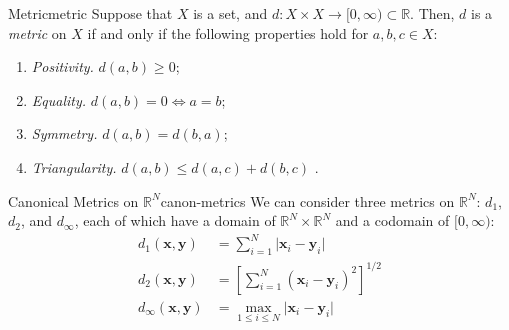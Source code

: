 \documentclass{article}
\renewcommand*\vec{\mathbf}
\numberwithin{equation}{section}
\numberwithin{enumi}{section}
\begin{document}
\begin{definition}{Metric}{metric}
    Suppose that $ X $ is a set, and $ d \colon X \times X \to [0, \infty)
    \subset \mathbb{R} $. Then, $ d $ is a \emph{metric} on $ X $ if and only if
    the following properties hold for $ a, b, c \in X $:
    \begin{enumerate}
        \item \emph{Positivity.} $ d(a, b) \geq 0 $;
        \item \emph{Equality.} $ d(a, b) = 0 \iff a = b $;
        \item \emph{Symmetry.} $ d(a, b) = d(b, a) $;
        \item \emph{Triangularity.} $ d(a, b) \leq d(a, c) + d(b, c) $
            \label{itm:triangle-inequality}.
    \end{enumerate}
\end{definition}
\begin{definition}{Canonical Metrics on \texorpdfstring{$\mathbb{R}^N$}{an
        N-dimensional real vector space}}{canon-metrics}
    We can consider three metrics on $ \mathbb{R}^N $: $ d_1 $, $ d_2 $, and
    $ d_\infty $, each of which have a domain of $ \mathbb{R}^N \times
    \mathbb{R}^N $ and a codomain of $ [0, \infty) $:
    \begin{align}
        d_1(\vec{x}, \vec{y}) &= \sum_{i=1}^N \vert \vec{x}_i - \vec{y}_i
            \vert \\
        d_2(\vec{x}, \vec{y}) &= \left[\sum_{i=1}^N (\vec{x}_i - \vec{y}_i)^2
            \right]^{1/2} \label{eqn:d2-metric} \\[.8em]
        d_\infty(\vec{x}, \vec{y}) &= \max_{1 \leq i \leq N} \vert \vec{x}_i -
            \vec{y}_i \vert
    \end{align}
\end{definition}
\end{document}
